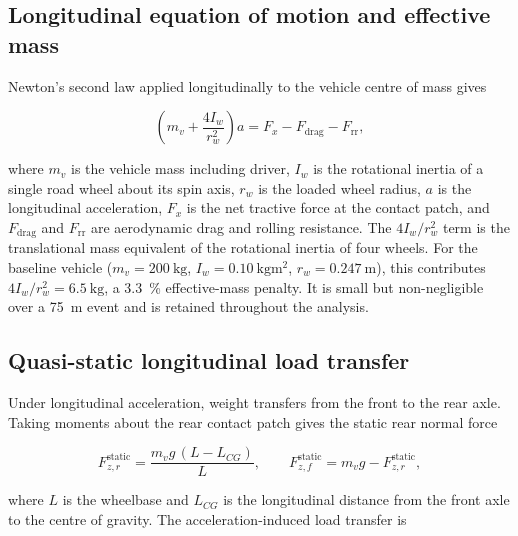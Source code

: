 \subsection{Longitudinal equation of motion and effective mass}
\label{sec:eom}

Newton's second law applied longitudinally to the vehicle centre of
mass gives

\begin{equation}
\left(m_v + \frac{4 I_w}{r_w^2}\right) a = F_x - F_\text{drag} - F_\text{rr},
\label{eq:eom}
\end{equation}

where $m_v$ is the vehicle mass including driver, $I_w$ is the
rotational inertia of a single road wheel about its spin axis, $r_w$
is the loaded wheel radius, $a$ is the longitudinal acceleration,
$F_x$ is the net tractive force at the contact patch, and
$F_\text{drag}$ and $F_\text{rr}$ are aerodynamic drag and rolling
resistance. The $4 I_w / r_w^2$ term is the translational mass
equivalent of the rotational inertia of four wheels. For the baseline
vehicle ($m_v = \SI{200}{\kilo\gram}$,
$I_w = \SI{0.10}{\kilo\gram\metre\squared}$,
$r_w = \SI{0.247}{\metre}$), this contributes
$4 I_w / r_w^2 = \SI{6.5}{\kilo\gram}$, a \SI{3.3}{\percent}
effective-mass penalty. It is small but non-negligible over a
\SI{75}{\metre} event and is retained throughout the analysis.

\subsection{Quasi-static longitudinal load transfer}
\label{sec:load_transfer}

Under longitudinal acceleration, weight transfers from the front to
the rear axle. Taking moments about the rear contact patch gives the
static rear normal force

\begin{equation}
F_{z,r}^{\text{static}} = \frac{m_v g \, (L - L_{CG})}{L},
\qquad
F_{z,f}^{\text{static}} = m_v g - F_{z,r}^{\text{static}},
\label{eq:static_normal}
\end{equation}

where $L$ is the wheelbase and $L_{CG}$ is the longitudinal distance
from the front axle to the centre of gravity. The
acceleration-induced load transfer is

